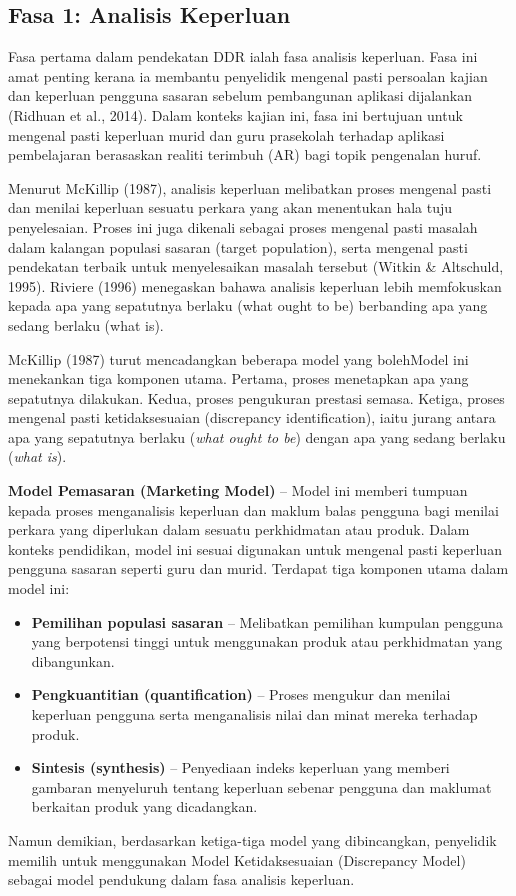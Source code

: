 \subsection{Fasa 1: Analisis Keperluan}

Fasa pertama dalam pendekatan DDR ialah fasa analisis keperluan. Fasa ini amat penting kerana ia membantu penyelidik mengenal pasti persoalan kajian dan keperluan pengguna sasaran sebelum pembangunan aplikasi dijalankan (Ridhuan et al., 2014). Dalam konteks kajian ini, fasa ini bertujuan untuk mengenal pasti keperluan murid dan guru prasekolah terhadap aplikasi pembelajaran berasaskan realiti terimbuh (AR) bagi topik pengenalan huruf.

Menurut McKillip (1987), analisis keperluan melibatkan proses mengenal pasti dan menilai keperluan sesuatu perkara yang akan menentukan hala tuju penyelesaian. Proses ini juga dikenali sebagai proses mengenal pasti masalah dalam kalangan populasi sasaran (target population), serta mengenal pasti pendekatan terbaik untuk menyelesaikan masalah tersebut (Witkin \& Altschuld, 1995). Riviere (1996) menegaskan bahawa analisis keperluan lebih memfokuskan kepada apa yang sepatutnya berlaku (what ought to be) berbanding apa yang sedang berlaku (what is).

McKillip (1987) turut mencadangkan beberapa model yang bolehModel ini menekankan tiga komponen utama. Pertama, proses menetapkan apa yang sepatutnya dilakukan. Kedua, proses pengukuran prestasi semasa. Ketiga, proses mengenal pasti ketidaksesuaian (discrepancy identification), iaitu jurang antara apa yang sepatutnya berlaku (\textit{what ought to be}) dengan apa yang sedang berlaku (\textit{what is}).

\item \textbf{Model Pemasaran (Marketing Model)} – Model ini memberi tumpuan kepada proses menganalisis keperluan dan maklum balas pengguna bagi menilai perkara yang diperlukan dalam sesuatu perkhidmatan atau produk. Dalam konteks pendidikan, model ini sesuai digunakan untuk mengenal pasti keperluan pengguna sasaran seperti guru dan murid. Terdapat tiga komponen utama dalam model ini:

\begin{itemize}
  \item \textbf{Pemilihan populasi sasaran} – Melibatkan pemilihan kumpulan pengguna yang berpotensi tinggi untuk menggunakan produk atau perkhidmatan yang dibangunkan.
  \item \textbf{Pengkuantitian (quantification)} – Proses mengukur dan menilai keperluan pengguna serta menganalisis nilai dan minat mereka terhadap produk.
  \item \textbf{Sintesis (synthesis)} – Penyediaan indeks keperluan yang memberi gambaran menyeluruh tentang keperluan sebenar pengguna dan maklumat berkaitan produk yang dicadangkan.
\end{itemize}
Namun demikian, berdasarkan ketiga-tiga model yang dibincangkan, penyelidik memilih untuk menggunakan Model Ketidaksesuaian (Discrepancy Model) sebagai model pendukung dalam fasa analisis keperluan.

